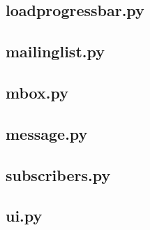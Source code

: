 \subsection*{loadprogressbar.py}



\subsection*{mailinglist.py}



\subsection*{mbox.py}



\subsection*{message.py}



\subsection*{subscribers.py}



\subsection*{ui.py}


